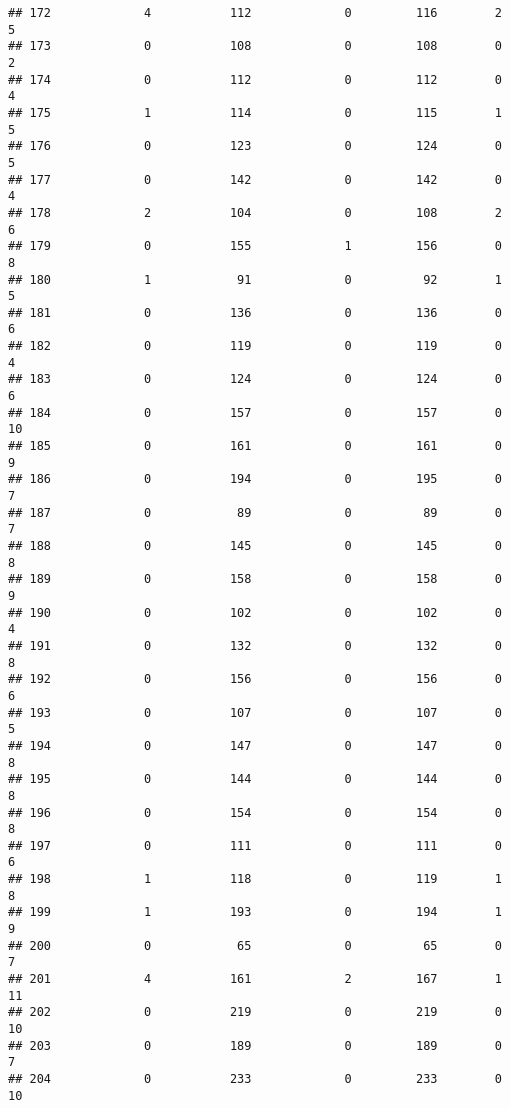 \documentclass[]{article}
\begin{document}
\begin{verbatim}
## 172             4           112             0         116        2        5
## 173             0           108             0         108        0        2
## 174             0           112             0         112        0        4
## 175             1           114             0         115        1        5
## 176             0           123             0         124        0        5
## 177             0           142             0         142        0        4
## 178             2           104             0         108        2        6
## 179             0           155             1         156        0        8
## 180             1            91             0          92        1        5
## 181             0           136             0         136        0        6
## 182             0           119             0         119        0        4
## 183             0           124             0         124        0        6
## 184             0           157             0         157        0       10
## 185             0           161             0         161        0        9
## 186             0           194             0         195        0        7
## 187             0            89             0          89        0        7
## 188             0           145             0         145        0        8
## 189             0           158             0         158        0        9
## 190             0           102             0         102        0        4
## 191             0           132             0         132        0        8
## 192             0           156             0         156        0        6
## 193             0           107             0         107        0        5
## 194             0           147             0         147        0        8
## 195             0           144             0         144        0        8
## 196             0           154             0         154        0        8
## 197             0           111             0         111        0        6
## 198             1           118             0         119        1        8
## 199             1           193             0         194        1        9
## 200             0            65             0          65        0        7
## 201             4           161             2         167        1       11
## 202             0           219             0         219        0       10
## 203             0           189             0         189        0        7
## 204             0           233             0         233        0       10

\end{verbatim}
\end{document}
